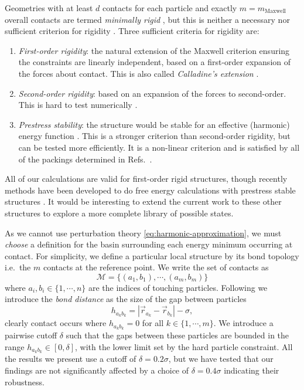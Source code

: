 \documentclass[11pt,twoside]{report}
\begin{document}
Geometries with at least $d$ contacts for each particle and exactly $m = m_\mathrm{Maxwell}$ overall contacts are termed \emph{minimally rigid} \cite{ArkusPRL2009}, but this is neither a necessary nor sufficient criterion for rigidity \cite{Holmes-CerfonARCMP2017}.
Three sufficient criteria for rigidity are: \cite{ConnellySJDM1996,Holmes-CerfonARCMP2017}
\begin{enumerate}
\item \emph{First-order rigidity}: the natural extension of the Maxwell criterion ensuring the constraints are linearly independent, based on a first-order expansion of the forces about contact.
  This is also called \emph{Calladine's extension} \cite{CalladineIJSS1978}.
\item \emph{Second-order rigidity}: based on an expansion of the forces to second-order.
  This is hard to test numerically \cite{Holmes-CerfonARCMP2017}.
\item \emph{Prestress stability}: the structure would be stable for an effective (harmonic) energy function \cite{ConnellySJDM1996}.
  This is a stronger criterion than second-order rigidity, but can be tested more efficiently.
  It is a non-linear criterion and is satisfied by all of the packings determined in Refs.\ \cite{ArkusPRL2009,Holmes-CerfonSR2016}.
\end{enumerate}
All of our calculations are valid for first-order rigid structures, though recently methods have been developed to do free energy calculations with prestress stable structures \cite{KallusPRE2017}.
It would be interesting to extend the current work to these other structures to explore a more complete library of possible states.

As we cannot use perturbation theory \eqref{eq:harmonic-approximation}, we must \emph{choose} a definition for the basin surrounding each energy minimum occurring at contact.
For simplicity, we define a particular local structure by its bond topology i.e.\ the $m$ contacts at the reference point.
We write the set of contacts as
\begin{equation}\label{eq:structure-contacts}
  \mathcal{M} = \{(a_1, b_1), \cdots, (a_m, b_m)\}
\end{equation}
where $a_i, b_i \in \{1, \cdots, n\}$ are the indices of touching particles.
Following \cite{Holmes-CerfonPNAS2013} we introduce the \emph{bond distance} as the size of the gap between particles
\begin{equation}\label{eq:bond-distance}
  h_{a_k b_k} = |\vec{r}_{a_k} - \vec{r}_{b_k}| - \sigma,
\end{equation}
clearly contact occurs where $h_{a_k b_k} = 0$ for all $k \in \{1, \cdots, m\}$.
We introduce a pairwise cutoff $\delta$ such that the gaps between these particles are bounded in the range $h_{a_k b_k} \in [0, \delta]$, with the lower limit set by the hard particle constraint.
All the results we present use a cutoff of $\delta = 0.2 \sigma$, but we have tested that our findings are not significantly affected by a choice of $\delta = 0.4 \sigma$ indicating their robustness.
\end{document}
